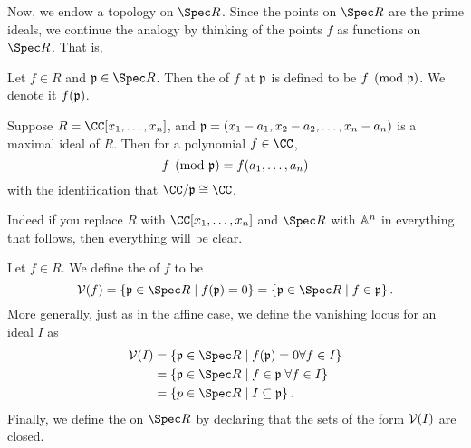 Now, we endow a topology on $\Spec R$.
Since the points on $\Spec R$ are the prime ideals, we continue
the analogy by thinking of the points $f$ as functions on $\Spec R$. That is,
\begin{definition}
	Let $f \in R$ and $\pp \in \Spec R$.
	Then the  of $f$ at $\mathfrak p$ is defined to be $f \pmod{\mathfrak p}$.
	We denote it $f(\mathfrak p)$.
\end{definition}
\begin{example}
	Suppose $R = \CC[x_1, \dots, x_n]$,
	and $\mathfrak p = (x_1-a_1, x_2-a_2, \dots, x_n-a_n)$ is a maximal ideal of $R$.
	Then for a polynomial $f \in \CC$,
	\[ f \pmod {\mathfrak p} = f(a_1, \dots, a_n) \]
	with the identification that $\CC/\pp \cong \CC$.
\end{example}
Indeed if you replace $R$ with $\CC[x_1, \dots, x_n]$
and $\Spec R$ with $\mathbb A^n$ in everything that follows,
then everything will be clear.

\begin{definition}
	Let $f \in R$. We define the  of $f$ to be
	\[ \VV(f) = \left\{ \pp \in \Spec R \mid f(\pp) = 0 \right\}
		= \left\{ \pp \in \Spec R \mid f \in \pp \right\}. \]
	More generally, just as in the affine case,
	we define the vanishing locus for an ideal $I$ as
	\begin{align*}
		\VV(I) &= \left\{ \pp \in \Spec R \mid f(\pp)=0 \forall f \in I \right\} \\
		&= \left\{ \pp \in \Spec R \mid f \in \pp \; \forall f \in I \right\} \\
		&= \left\{ p \in \Spec R \mid I \subseteq \pp \right\}.
	\end{align*}
	Finally, we define the  on $\Spec R$
	by declaring that the sets of the form $\mathcal V(I)$ are closed.
\end{definition}

